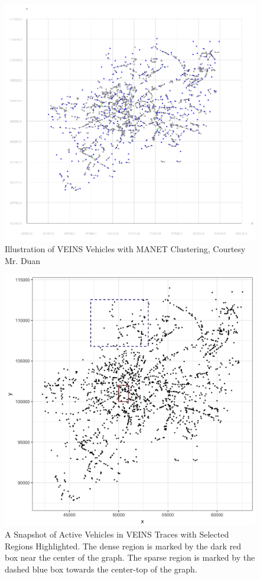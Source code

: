 \documentclass{thesis}
\begin{document}
    \begin{figure}
        \centering
        \includegraphics[scale=.5]{binImages/xiaotian-clusters.png}
        \caption{Illustration of VEINS Vehicles with MANET Clustering, Courtesy Mr. Duan \cite{xiaotian}}
        \label{fig:clusters}
    \end{figure}
    \begin{figure}
        \centering
        \includegraphics[scale=.2]{binImages/cars.png}
        \caption{A Snapshot of Active Vehicles in VEINS Traces with Selected Regions Highlighted.
                The dense region is marked by the dark red box near the center of the graph. The
                sparse region is marked by the dashed blue box towards the center-top of the graph.}
        \label{fig:regions}
    \end{figure}
\end{document}
